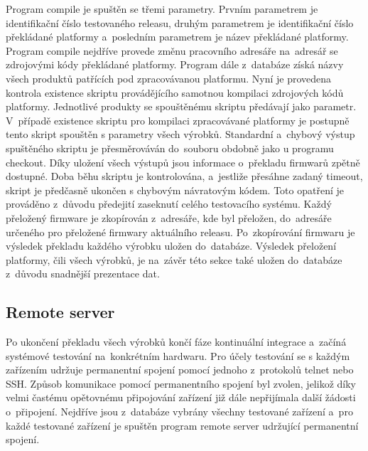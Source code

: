 Program compile je spuštěn se třemi parametry. Prvním parametrem je identifikační číslo testovaného releasu, druhým parametrem je identifikační číslo překládané platformy a~posledním parametrem je název překládané platformy. Program compile nejdříve provede změnu pracovního adresáře na~adresář se zdrojovými kódy překládané platformy. Program dále z~databáze získá názvy všech produktů patřících pod zpracovávanou platformu. Nyní je provedena kontrola existence skriptu provádějícího samotnou kompilaci zdrojových kódů platformy. Jednotlivé produkty se spouštěnému skriptu předávají jako parametr. V~případě existence skriptu pro kompilaci zpracovávané platformy je postupně tento skript spouštěn s parametry všech výrobků. Standardní a~chybový výstup spuštěného skriptu je přesměrováván do~souboru obdobně jako u programu checkout. Díky uložení všech výstupů jsou informace o~překladu firmwarů zpětně dostupné. Doba běhu skriptu je kontrolována, a~jestliže přesáhne zadaný timeout, skript je předčasně ukončen s chybovým návratovým kódem. Toto opatření je prováděno z~důvodu předejití zaseknutí celého testovacího systému. Každý přeložený firmware je zkopírován z~adresáře, kde byl přeložen, do~adresáře určeného pro přeložené firmwary aktuálního releasu. Po~zkopírování firmwaru je výsledek překladu každého výrobku uložen do~databáze. Výsledek přeložení platformy, čili všech výrobků, je na~závěr této sekce také uložen do~databáze z~důvodu snadnější prezentace dat.

\subsection{Remote server}
Po ukončení překladu všech výrobků končí fáze kontinuální integrace a~začíná systémové testování na~konkrétním hardwaru. Pro účely testování se s každým zařízením udržuje permanentní spojení pomocí jednoho z~protokolů telnet nebo SSH. Způsob komunikace pomocí permanentního spojení byl zvolen, jelikož díky velmi častému opětovnému připojování zařízení již dále nepřijímala další žádosti o~připojení. Nejdříve jsou z~databáze vybrány všechny testované zařízení a~pro každé testované zařízení je spuštěn program remote server udržující permanentní spojení.

